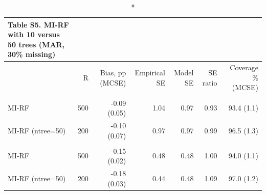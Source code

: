 \begingroup
\fontsize{8.0pt}{10.0pt}\selectfont
\begin{longtable}{l|rrrrrr}
\caption*{
{\fontsize{20}{25}\selectfont  Table S5. MI-RF with 10 versus 50 trees (MAR, 30\% missing)\fontsize{8}{10}\selectfont }
} \\ 
\toprule
 & R & Bias, pp (MCSE) & Empirical SE & Model SE & SE ratio & Coverage \% (MCSE) \\ 
\midrule\endhead\addlinespace[2.5pt]
\multicolumn{7}{l}{Stunting} \\[2.5pt] 
\midrule\addlinespace[2.5pt]
MI-RF & 500 & -0.09 (0.05) & 1.04 & 0.97 & 0.93 & 93.4 (1.1) \\ 
MI-RF (ntree=50) & 200 & -0.10 (0.07) & 0.97 & 0.97 & 0.99 & 96.5 (1.3) \\ 
\midrule\addlinespace[2.5pt]
\multicolumn{7}{l}{Wasting} \\[2.5pt] 
\midrule\addlinespace[2.5pt]
MI-RF & 500 & -0.15 (0.02) & 0.48 & 0.48 & 1.00 & 94.0 (1.1) \\ 
MI-RF (ntree=50) & 200 & -0.18 (0.03) & 0.44 & 0.48 & 1.09 & 97.0 (1.2) \\ 
\bottomrule
\end{longtable}
\endgroup

